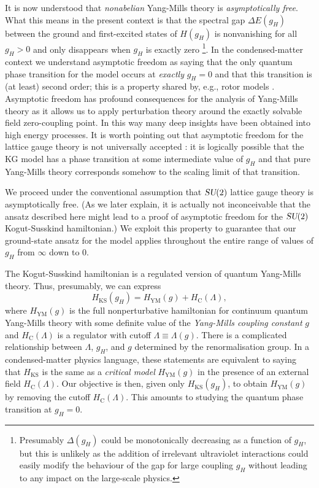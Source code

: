 \documentclass[twocolumn,lengthcheck,superscriptaddress]{revtex4-1}
\def\su2{\textsl{SU}(2)}
\theoremstyle{definition}
\theoremstyle{remark}
\begin{document}
It is now understood that \emph{nonabelian} Yang-Mills theory is \emph{asymptotically free}. What this means in the present context is that the spectral gap $\Delta E(g_H)$ between the ground and first-excited states of $H(g_H)$ is nonvanishing for all $g_H >0$ and only disappears when $g_H$ is exactly zero \footnote{Presumably $\Delta(g_H)$ could be monotonically decreasing as a function of $g_H$, but this is unlikely as the addition of irrelevant ultraviolet interactions could easily modify the behaviour of the gap for large coupling $g_H$ without leading to any impact on the large-scale physics.}. In the condensed-matter context we understand asymptotic freedom as saying that the only quantum phase transition for the model occurs at \emph{exactly} $g_H=0$ and that this transition is (at least) second order; this is a property shared by, e.g., rotor models \cite{sachdev:2011a}. Asymptotic freedom has profound consequences for the analysis of Yang-Mills theory as it allows us to apply perturbation theory around the exactly solvable field zero-coupling point. In this way many deep insights have been obtained into high energy processes. It is worth pointing out that asymptotic freedom for the lattice gauge theory is not universally accepted \cite{seiler:2003a}: it is logically possible that the KG model has a phase transition at some intermediate value of $g_H$ and that pure Yang-Mills theory corresponds somehow to the scaling limit of that transition. 

We proceed under the conventional assumption that $\su2$ lattice gauge theory is asymptotically free. (As we later explain, it is actually not inconceivable that the ansatz described here might lead to a proof of asymptotic freedom for the $\su2$ Kogut-Susskind hamiltonian.) We exploit this property to guarantee that our ground-state ansatz for the model applies throughout the entire range of values of $g_H$ from $\infty$ down to $0$.

The Kogut-Susskind hamiltonian is a regulated version of quantum Yang-Mills theory. Thus, presumably, we can express
\begin{equation}
	H_{\text{KS}}(g_H) = H_{\text{YM}}(g) + H_{\text{C}}(\Lambda),
\end{equation}
where $H_{\text{YM}}(g)$ is the full nonperturbative hamiltonian for continuum quantum Yang-Mills theory with some definite value of the \emph{Yang-Mills coupling constant} $g$ and $H_{\text{C}}(\Lambda)$ is a regulator with cutoff $\Lambda \equiv \Lambda(g)$. There is a complicated relationship between $\Lambda$, $g_H$, and $g$ determined by the renormalisation group. In a condensed-matter physics language, these statements are equivalent to saying that $H_{\text{KS}}$ is the same as a \emph{critical model} $H_{\text{YM}}(g)$ in the presence of an external field $H_{\text{C}}(\Lambda)$. Our objective is then, given only $H_{\text{KS}}(g_H)$, to obtain $H_{\text{YM}}(g)$ by removing the cutoff $H_{\text{C}}(\Lambda)$. This amounts to studying the quantum phase transition at $g_H = 0$.
\end{document}
